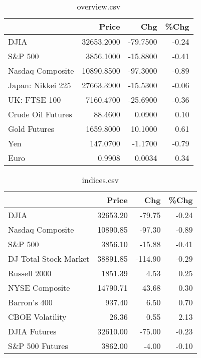 \documentclass{article}%
\begin{document}
\begin{table}[htbp]%
\caption{overview.csv}%
\centering%
\begin{adjustbox}{width=1\textwidth}%
\begin{tabular}{lrrr}
\toprule
                  &      Price &      Chg &  \%Chg \\
\midrule
             DJIA & 32653.2000 & -79.7500 & -0.24 \\
          S\&P 500 &  3856.1000 & -15.8800 & -0.41 \\
 Nasdaq Composite & 10890.8500 & -97.3000 & -0.89 \\
Japan: Nikkei 225 & 27663.3900 & -15.5300 & -0.06 \\
     UK: FTSE 100 &  7160.4700 & -25.6900 & -0.36 \\
Crude Oil Futures &    88.4600 &   0.0900 &  0.10 \\
     Gold Futures &  1659.8000 &  10.1000 &  0.61 \\
              Yen &   147.0700 &  -1.1700 & -0.79 \\
             Euro &     0.9908 &   0.0034 &  0.34 \\
\bottomrule
\end{tabular}
%
\end{adjustbox}%
\end{table}

%


\begin{table}[htbp]%
\caption{indices.csv}%
\centering%
\begin{adjustbox}{width=1\textwidth}%
\begin{tabular}{lrrr}
\toprule
                      &    Price &     Chg &  \%Chg \\
\midrule
                 DJIA & 32653.20 &  -79.75 & -0.24 \\
     Nasdaq Composite & 10890.85 &  -97.30 & -0.89 \\
              S\&P 500 &  3856.10 &  -15.88 & -0.41 \\
DJ Total Stock Market & 38891.85 & -114.90 & -0.29 \\
         Russell 2000 &  1851.39 &    4.53 &  0.25 \\
       NYSE Composite & 14790.71 &   43.68 &  0.30 \\
         Barron's 400 &   937.40 &    6.50 &  0.70 \\
      CBOE Volatility &    26.36 &    0.55 &  2.13 \\
         DJIA Futures & 32610.00 &  -75.00 & -0.23 \\
      S\&P 500 Futures &  3862.00 &   -4.00 & -0.10 \\
\bottomrule
\end{tabular}
%
\end{adjustbox}%
\end{table}
\end{document}
